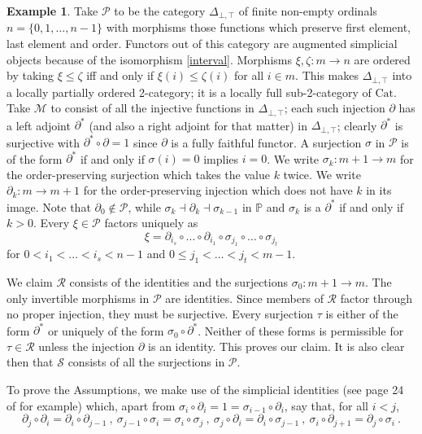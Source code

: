\documentclass[a4paper,12pt,reqno]{amsart}
\theoremstyle{definition}
\newtheorem{example}[theorem]{Example}
\theoremstyle{fact}
\theoremstyle{genquest}
\theoremstyle{step}
\newcommand{\dd}{\colon}
\newcommand{\ra}{\rightarrow}
\def\CM{{\mathscr M}}
\def\CP{{\mathscr P}}
\def\CR{{\mathscr R}}
\def\CS{{\mathscr S}}
\begin{document}
\begin{example}\label{Ex2+}
Take $\CP$ to be the category $\Delta_{\bot,\top}$ of finite
non-empty ordinals $n = \{0,1,\dots,n-1\}$ with morphisms those functions which preserve
first element, last element and order.
Functors out of this category are augmented simplicial objects because of the isomorphism \eqref{interval}. 
Morphisms $\xi, \zeta \dd m\ra n$ are ordered by taking $\xi \le \zeta$ iff and only if 
$\xi(i) \le \zeta(i)$ for all $i\in m$. This makes $\Delta_{\bot,\top}$ into a locally
partially ordered 2-category;
it is a locally full sub-2-category of $\mathrm{Cat}$. 
Take $\CM$ to consist of all the injective functions in $\Delta_{\bot,\top}$;
each such injection $\partial$ has a left adjoint $\partial^*$ 
(and also a right adjoint for that matter) in $\Delta_{\bot,\top}$; clearly $\partial^*$ is
surjective with $\partial^* \circ \partial = 1$ since $\partial$ is a fully faithful functor.
A surjection $\sigma$ in $\CP$ is of the form $\partial^*$ if and only if $\sigma(i)=0$
implies $i=0$.    
We write $\sigma_k \dd m+1 \ra m$ for the order-preserving surjection which takes the value $k$ twice.
We write $\partial_k \dd m \ra m+1$ for the order-preserving injection which does not have $k$ in its image. 
Note that $\partial_0\notin \CP$, while $\sigma_k \dashv \partial_k  \dashv \sigma_{k-1}$ 
in $\mathbb{P}$ and $\sigma_k$ is a $\partial^*$ if and only if $k>0$.
Every $\xi \in \CP$ factors uniquely as 
$$\xi = \partial_{i_s}\circ \dots \circ \partial_{i_1}\circ \sigma_{j_1}\circ \dots \circ \sigma_{j_t}$$ 
for $0< i_1<\dots < i_s < n-1$ and $0\le j_1<\dots < j_t < m-1$. 

We claim $\CR$ consists of the identities and the surjections $\sigma_0 : m+1 \ra m$.
The only invertible morphisms in $\CP$ are identities.
Since members of $\CR$ factor through no proper injection, they must be surjective.
Every surjection $\tau$ is either of the form $\partial^*$ or uniquely of the form 
$\sigma_0\circ \partial^*$. 
Neither of these forms is permissible for $\tau \in \CR$ unless the injection $\partial$
is an identity. This proves our claim. 
It is also clear then that $\CS$ consists of all the surjections in $\CP$. 

To prove the Assumptions, we make use of the simplicial identities 
(see page 24 of \cite{GabZis} for example) which, 
apart from $\sigma_i\circ \partial_i = 1 = \sigma_{i-1}\circ \partial_i$,
say that, for all $i<j$, 
$$\partial_j\circ \partial_i = \partial_i \circ \partial_{j-1} \ , \ \sigma_{j-1}\circ \sigma_i = \sigma_i \circ \sigma_j \ , \ \sigma_{j}\circ \partial_i = \partial_i \circ \sigma_{j-1} \ , \ \sigma_{i}\circ \partial_{j+1} = \partial_j \circ \sigma_i \ .$$


\end{example}
\end{document}
